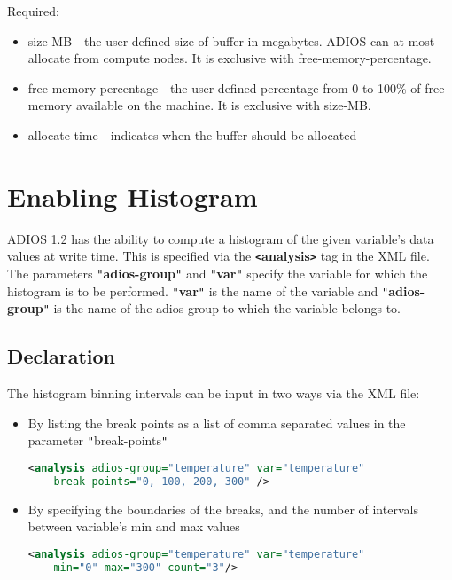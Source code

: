 Required:
\begin{itemize}
\item size-MB - the user-defined size of  buffer in megabytes. ADIOS can at most allocate 
from compute nodes. It is exclusive with free-memory-percentage.
\item free-memory percentage - the user-defined percentage from 0 to 100\% of free memory 
available on the machine. It is exclusive with size-MB.
\item allocate-time - indicates when the buffer should be allocated
\end{itemize}

\section{Enabling Histogram}

ADIOS 1.2 has the ability to {\color{color01} compute a histogram of the given 
variable's data values at write time}. This is specified via the \textbf{\texttt{<}analysis\texttt{>}} 
tag in the XML file. The parameters \texttt{"}\textbf{adios-group}\texttt{"} and 
\texttt{"}\textbf{var}\texttt{"} specify the variable for which the histogram is 
to be performed. \texttt{"}\textbf{var}\texttt{"} is the name of the variable and 
\texttt{"}\textbf{adios-group}\texttt{"} is the name of the adios group to which 
the variable belongs to.

\subsection{Declaration}
The histogram binning intervals can be input in two ways via the XML file:
\begin{itemize}
\item By listing the break points as a list of comma separated values 
in the parameter \texttt{"}break-points\texttt{"} 
\begin{lstlisting}[language=XML]
<analysis adios-group="temperature" var="temperature"
    break-points="0, 100, 200, 300" />
\end{lstlisting}

\item By specifying the boundaries of the breaks, and the number 
of intervals between variable's min and max values
\begin{lstlisting}[language=XML]
<analysis adios-group="temperature" var="temperature"
    min="0" max="300" count="3"/>
\end{lstlisting}
\end{itemize}

